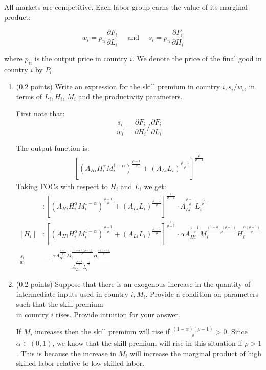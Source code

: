 \documentclass[answers]{exam}
\begin{document}
\begin{questions}
    All markets are competitive. Each labor group earns the value of its marginal product:
    
    $$
    w_{i}=p_{i i} \frac{\partial F_{i}}{\partial L_{i}} \quad \text { and } \quad s_{i}=p_{i i} \frac{\partial F_{i}}{\partial H_{i}}
    $$
    
    where $p_{i i}$ is the output price in country $i$. We denote the price of the final good in country $i$ by $P_{i}$.
    
    \begin{enumerate}
      \item (0.2 points) Write an expression for the skill premium in country $i, s_{i} / w_{i}$, in terms of $L_{i}, H_{i}$, $M_{i}$ and the productivity parameters.
      \begin{solution}
        First note that:  
        $$\frac{s_i}{w_i} = \frac{\partial F_i}{\partial H_i} / \frac{\partial F_i}{\partial L_i}$$

        The output function is:
        \begin{align*}
            \left[\left(A_{H i} H_{i}^{\alpha} M_{i}^{1-\alpha}\right)^{\frac{\rho-1}{\rho}}+\left(A_{L i} L_{i}\right)^{\frac{\rho-1}{\rho}}\right]^{\frac{\rho}{\rho-1}}
        \end{align*}
        Taking FOCs with respect to $H_i$ and $L_i$ we get:
        \begin{align*}
           [L_i]&: [(A_{H i} H_{i}^{\alpha} M_{i}^{1-\alpha})^{\frac{\rho-1}{\rho}} + (A_{L i} L_{i})^{\frac{\rho-1}{\rho}}]^{\frac{1}{\rho-1}} \cdot A_{L i}^\frac{\rho-1}{\rho} L_i^\frac{-1}{\rho}\\
           [H_i]&: [(A_{H i} H_{i}^{\alpha} M_{i}^{1-\alpha})^{\frac{\rho-1}{\rho}} + (A_{L i} L_{i})^{\frac{\rho-1}{\rho}}]^{\frac{1}{\rho-1}} \cdot \alpha A_{H i}^\frac{\rho-1}{\rho} M_i^\frac{(1-\alpha)(\rho-1)}{\rho} H_i^\frac{\alpha(\rho-1)}{\rho}\\
           \frac{s_i}{w_i} &= \frac{\alpha A_{H i}^\frac{\rho-1}{\rho} M_i^\frac{(1-\alpha)(\rho-1)}{\rho} H_i^\frac{\alpha(\rho-1)}{\rho}}{A_{L i}^\frac{\rho-1}{\rho} L_i^\frac{-1}{\rho}}
        \end{align*}
    \end{solution}
      \item (0.2 points) Suppose that there is an exogenous increase in the quantity of intermediate inputs used in country $i, M_{i}$. Provide a condition on parameters such that the skill premium\\
    in country $i$ rises. Provide intuition for your answer.
    \begin{solution}
        If $M_i$ increases then the skill premium will rise if $\frac{(1-\alpha)(\rho-1)}{\rho} > 0$. Since $\alpha \in (0,1)$, we know that the skill premium will rise in this situation if $\rho > 1$. This is because the increase in $M_i$ will increase the marginal product of high skilled labor relative to low skilled labor. 
    \end{solution}
    

\end{enumerate}
\end{questions}
\end{document}
